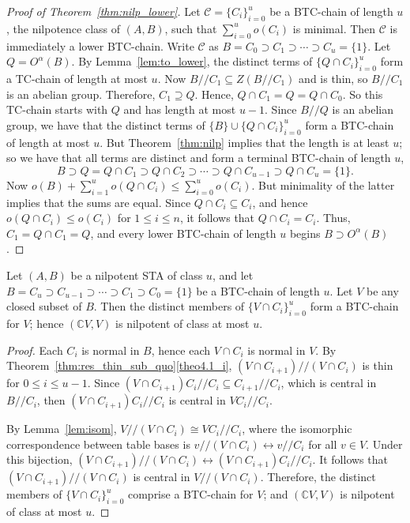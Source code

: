 \documentclass[ALCO,ThmDefs,Unicode,epreuves]{cedram}
\newcommand{\C}{{\mathbb C}}
\begin{document}
\begin{proof} [Proof of Theorem~\ref{thm:nilp_lower}] 
Let $\mathcal{C} = \{C_i\}_{i=0}^u$ be a BTC-chain of length $u$, the
nilpotence class of $(A, B)$, such that $\sum_{i=0}^uo(C_i)$ is minimal.
Then $\mathcal{C}$ is immediately a lower BTC-chain. Write
$\mathcal{C}$ as $B = C_0 \supset C_1 \supset \cdots \supset C_u =
\{1\}$. Let $Q = O^{\alpha}(B)$. By Lemma~\ref{lem:to_lower}, the
distinct terms of $\{Q\cap C_i\}_{i=0}^u$ form a TC-chain of length at
most $u$. Now $B//C_1 \subseteq Z(B//C_1)$ and is thin, so $B//C_1$ is an
abelian group. Therefore, $C_1 \supseteq Q$. Hence, $Q\cap C_1 = Q =
Q\cap C_0$. So this TC-chain starts with $Q$ and has length at most
$u-1$. Since $B//Q$ is an abelian group, we have that the distinct
terms of $\{B\}\cup \{Q\cap C_i\}_{i=0}^u$ form a BTC-chain of
length at most $u$. But Theorem~\ref{thm:nilp} implies that the length
is at least $u$; so we have that all terms are distinct and form a
terminal BTC-chain of length $u$, 
\begin{equation}
\label{eq:lower}
B \supset Q = Q\cap C_1 \supset Q\cap C_2 \supset \cdots \supset Q\cap
C_{u-1} \supset Q\cap C_u = \{1\}. 
\end{equation}
Now $o(B) + \sum_{i=1}^uo(Q\cap C_i) \leq \sum_{i=0}^uo(C_i)$. But
minimality of the latter implies that the sums are equal. Since $Q\cap
C_i \subseteq C_i$, and hence $o(Q\cap C_i) \leq o(C_i)$ for $1 \leq i
\leq n$, it follows
that $Q\cap C_i = C_i$. Thus, $C_1 = Q\cap C_1 = Q$, and every lower
BTC-chain of length $u$ begins 
$B \supset O^{\alpha}(B)$. 
\end{proof}
 
 
\begin{thm}
\label{thm:closed_sub_nilp}
Let $(A, B)$ be a nilpotent STA of class $u$, and let $B = C_u \supset
C_{u-1} \supset \cdots \supset C_1 \supset C_0 = \{1\}$ be a BTC-chain
of length $u$. Let $V$ be any closed subset of $B$. Then the distinct
members of $\{V\cap C_i\}_{i=0}^u$ form a BTC-chain for $V$; hence
$({\C}V, V)$
is nilpotent of class at most $u$. 
\end{thm}

\begin{proof}
Each $C_i$ is normal in $B$, hence each $V\cap C_i$ is normal in $V$.
By Theorem~\ref{thm:res_thin_sub_quo}\ref{theo4.1_i}, $(V\cap C_{i+1})//(V\cap C_i)$
is thin for $0 \leq i \leq u-1$. Since $(V\cap C_{i+1})C_i//C_i
\subseteq C_{i+1}//C_i$, which is central in $B//C_i$, then $(V\cap
C_{i+1})C_i//C_i$ is central in $VC_i//C_i$. 

By Lemma~\ref{lem:isom}, $V//(V\cap C_i) \cong VC_i//C_i$, where the
isomorphic correspondence between table bases is $v//(V\cap C_i)
\leftrightarrow v//C_i$ for all $v \in V$. Under this bijection,
$(V\cap C_{i+1})//(V\cap C_i) \leftrightarrow (V\cap C_{i+1})C_i//C_i$.
It follows that $(V\cap C_{i+1})//(V\cap C_i)$ is central in $V//(V\cap
C_i)$. Therefore, the distinct members of $\{V\cap C_i\}_{i=0}^u$
comprise a BTC-chain for $V$; and $({\C}V, V)$ is nilpotent of class at
most $u$.
\end{proof} 
\end{document}
